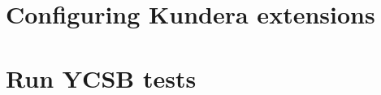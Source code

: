\documentclass[12pt,a4paper,twoside,openright]{report}
\begin{document}
\chapter{Configuring Kundera extensions}
\label{app:kconfig}


\chapter{Run YCSB tests}
\label{app:ycsb}




\end{document}
